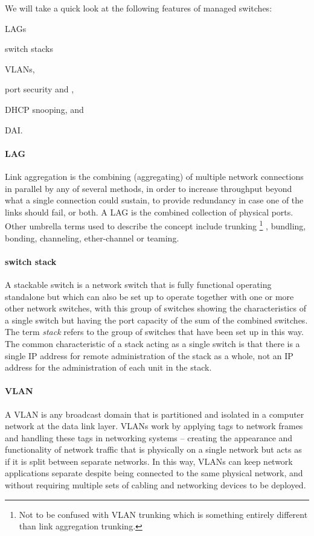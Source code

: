 We will take a quick look at the following features of managed switches:
\begin{inlinelist}
\item \acfp{LAG}
\item switch stacks
\item \aclp{VLAN},
\item port security and ,
\item \acs{DHCP} snooping, and
\item \acl{DAI}.
\end{inlinelist}

\paragraph{\acf{LAG}}
Link aggregation is the combining (aggregating) of multiple network connections in parallel by any of several methods, in order to increase throughput beyond what a single connection could sustain, to provide redundancy in case one of the links should fail, or both.
A \ac{LAG} is the combined collection of physical ports.
Other umbrella terms used to describe the concept include trunking%
   \footnote{Not to be confused with \acs{VLAN} trunking which is something entirely different than link aggregation trunking.}%
, bundling, bonding, channeling, ether-channel or teaming.


\paragraph{switch stack}
A stackable switch is a network switch that is fully functional operating standalone but which can also be set up to operate together with one or more other network switches, with this group of switches showing the characteristics of a single switch but having the port capacity of the sum of the combined switches.
The term \emph{stack} refers to the group of switches that have been set up in this way.
The common characteristic of a stack acting as a single switch is that there is a single \acs{IP} address for remote administration of the stack as a whole, not an \acs{IP} address for the administration of each unit in the stack.

\paragraph{\acs{VLAN}}
A \acf{VLAN} is any broadcast domain that is partitioned and isolated in a computer network at the data link layer.
\acp{VLAN} work by applying tags to network frames and handling these tags in networking systems -- creating the appearance and functionality of network traffic that is physically on a single network but acts as if it is split between separate networks.
In this way, \acp{VLAN} can keep network applications separate despite being connected to the same physical network, and without requiring multiple sets of cabling and networking devices to be deployed.


